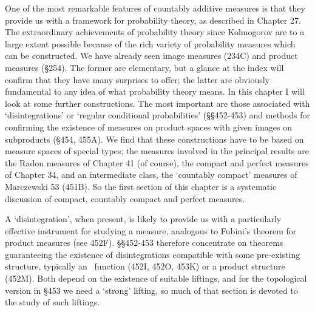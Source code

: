 
\def\chaptername{Perfect measures and disintegrations}
\def\sectionname{Introduction}


One of the most remarkable features of countably additive
measures is that they provide us with a framework for probability
theory, as described in Chapter 27.   The extraordinary achievements of
probability theory since Kolmogorov are to a large extent possible
because of the rich variety of probability measures which can be
constructed.   We have already seen image measures (234C)
and product measures (\S254).   The former are elementary,
but a glance at the index will confirm that they have many
surprises to offer;  the latter are obviously fundamental to any idea of
what probability theory means.   In this chapter I will look at some
further constructions.   The most important are those associated with
`disintegrations' or `regular conditional probabilities' (\S\S452-453)
and methods for confirming the existence of measures on product spaces
with given images on subproducts (\S454, 455A).   We find that these
constructions have to be based on measure spaces of special types;  the
measures involved in the principal results are the Radon measures of
Chapter 41 (of course), the compact and perfect measures of Chapter 34,
and an intermediate class, the `countably compact' measures of
{\smc Marczewski 53} (451B).   So the first section of this chapter is a
systematic discussion of compact, countably compact and perfect
measures.

A `disintegration', when present, is likely to provide us with a
particularly effective instrument for studying a measure, analogous to
Fubini's theorem for product measures (see 452F).   \S\S452-453
therefore concentrate on theorems guaranteeing the existence of
disintegrations compatible with some pre-existing structure, typically
an \imp\ function (452I, 452O, 453K) or a product structure
(452M).   Both depend on the existence of
suitable liftings, and for the topological version in \S453 we need a
`strong' lifting, so much of that section is devoted to the study of
such liftings.

